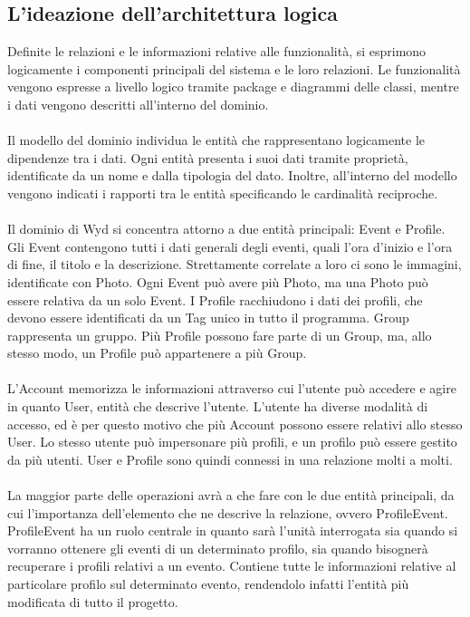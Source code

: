 \clearpage




\subsection{L'ideazione dell'architettura logica}
Definite le relazioni e le informazioni relative alle funzionalità,
si esprimono logicamente i componenti principali del sistema e le loro relazioni.
Le funzionalità vengono espresse a livello logico tramite package e diagrammi delle classi,
mentre i dati vengono descritti all'interno del dominio. \\
\\
Il modello del dominio individua le entità che rappresentano logicamente le dipendenze tra i dati.
Ogni entità presenta i suoi dati tramite proprietà,
identificate da un nome e dalla tipologia del dato.
Inoltre, all'interno del modello vengono indicati i rapporti tra le entità specificando le cardinalità reciproche.\\
\\
Il dominio di Wyd si concentra attorno a due entità principali: Event e Profile.\\
Gli Event contengono tutti i dati generali degli eventi,
quali l'ora d'inizio e l'ora di fine, il titolo e la descrizione.
Strettamente correlate a loro ci sono le immagini, identificate con Photo.
Ogni Event può avere più Photo, ma una Photo può essere relativa da un solo Event.
I Profile racchiudono i dati dei profili, che devono essere identificati da un Tag unico in tutto il programma.
Group rappresenta un gruppo.
Più Profile possono fare parte di un Group, ma, allo stesso modo, un Profile può appartenere a più Group.\\
\\
L'Account memorizza le informazioni attraverso cui l'utente può accedere e
agire in quanto User, entità che descrive l'utente.
L'utente ha diverse modalità di accesso,
ed è per questo motivo che più Account possono essere relativi allo stesso User.
Lo stesso utente può impersonare più profili,
e un profilo può essere gestito da più utenti.
User e Profile sono quindi connessi in una relazione molti a molti.\\
\\
La maggior parte delle operazioni avrà a che fare con le due entità principali,
da cui l'importanza dell'elemento che ne descrive la relazione, ovvero ProfileEvent.\\
ProfileEvent ha un ruolo centrale in quanto sarà l'unità interrogata
sia quando si vorranno ottenere gli eventi di un determinato profilo,
sia quando bisognerà recuperare i profili relativi a un evento.
Contiene tutte le informazioni relative al particolare profilo sul determinato evento,
rendendolo infatti l'entità più modificata di tutto il progetto.\\
\\

